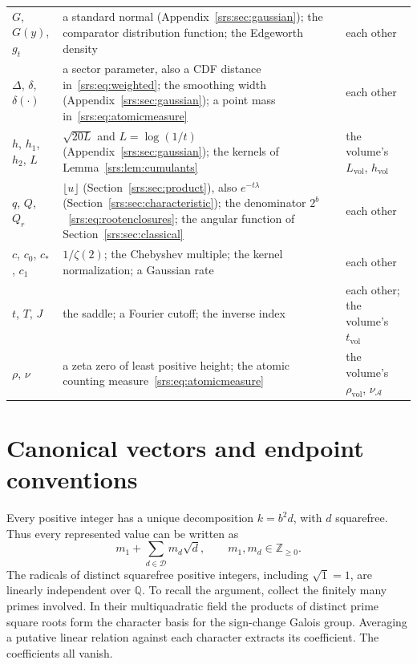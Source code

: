 \documentclass[11pt]{article}
\numberwithin{equation}{section}
\theoremstyle{remark}\newtheorem{remark}[theorem]{Remark}
\newcommand{\Sf}{\mathcal D}
\newcommand{\Z}{\mathbb Z}
\begin{document}
\begin{minipage}{\textwidth}
\begin{tabular}{@{}>{\raggedright\arraybackslash}p{0.95in}>{\raggedright\arraybackslash}p{3.35in}>{\raggedright\arraybackslash}p{1.8in}@{}}
$G$, $G(y)$, $g_t$ & a standard normal (Appendix~\ref{srs:sec:gaussian}); the comparator distribution function; the Edgeworth density & each other\\
$\Delta$, $\delta$, $\delta(\cdot)$ & a sector parameter, also a CDF distance in~\eqref{srs:eq:weighted}; the smoothing width (Appendix~\ref{srs:sec:gaussian}); a point mass in~\eqref{srs:eq:atomicmeasure} & each other\\
$h$, $h_1$, $h_2$, $L$ & $\sqrt{20L}$ and $L=\log(1/t)$ (Appendix~\ref{srs:sec:gaussian}); the kernels of Lemma~\ref{srs:lem:cumulants} & the volume's $L_{\mathrm{vol}}$, $h_{\mathrm{vol}}$\\
$q$, $Q$, $Q_r$ & $\lfloor u\rfloor$ (Section~\ref{srs:sec:product}), also $e^{-t\lambda}$ (Section~\ref{srs:sec:characteristic}); the denominator $2^b$~\eqref{srs:eq:rootenclosures}; the angular function of Section~\ref{srs:sec:classical} & each other\\
$c$, $c_0$, $c_*$, $c_1$ & $1/\zeta(2)$; the Chebyshev multiple; the kernel normalization; a Gaussian rate & each other\\
$t$, $T$, $J$ & the saddle; a Fourier cutoff; the inverse index & each other; the volume's $t_{\mathrm{vol}}$\\
$\rho$, $\nu$ & a zeta zero of least positive height; the atomic counting measure~\eqref{srs:eq:atomicmeasure} & the volume's $\rho_{\mathrm{vol}}$, $\nu_{\mathcal A}$\\
\bottomrule
\end{tabular}
\endgroup
\end{minipage}

\section{Canonical vectors and endpoint conventions}\label{srs:sec:canonical}
Every positive integer has a unique decomposition $k=b^2d$, with $d$ squarefree. Thus every represented value can be written as
\begin{equation}
 m_1+\sum_{d\in\Sf}m_d\sqrt d,\qquad m_1,m_d\in\Z_{\ge0}.
 \label{srs:eq:canonical}
\end{equation}
The radicals of distinct squarefree positive integers, including $\sqrt1=1$, are linearly independent over $\mathbb Q$. To recall the argument, collect the finitely many primes involved. In their multiquadratic field the products of distinct prime square roots form the character basis for the sign-change Galois group. Averaging a putative linear relation against each character extracts its coefficient. The coefficients all vanish.
\end{document}
